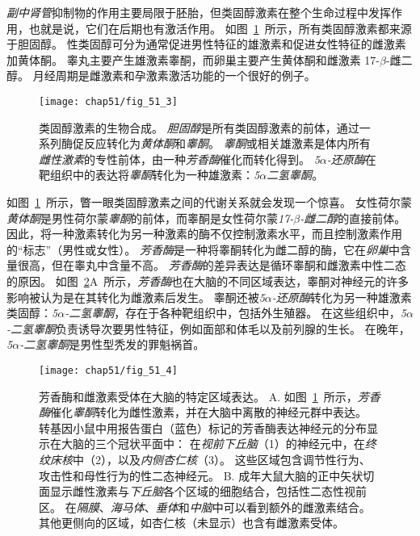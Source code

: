 \textit{副中肾管}抑制物的作用主要局限于胚胎，但类固醇激素在整个生命过程中发挥作用，也就是说，它们在后期也有激活作用。
如图~\ref{fig:51_3}~所示，所有类固醇激素都来源于胆固醇。
性类固醇可分为通常促进男性特征的雄激素和促进女性特征的雌激素加黄体酮。
睾丸主要产生雄激素睾酮，而卵巢主要产生黄体酮和雌激素 17-$ \beta $-雌二醇。
月经周期是雌激素和孕激素激活功能的一个很好的例子。


\begin{figure}[htbp]
	\centering
	\texttt{[image: chap51/fig\_51\_3]}
	\caption{类固醇激素的生物合成。
		\textit{胆固醇}是所有类固醇激素的前体，通过一系列酶促反应转化为\textit{黄体酮}和\textit{睾酮}。
		\textit{睾酮}或相关雄激素是体内所有\textit{雌性激素}的专性前体，由一种\textit{芳香酶}催化而转化得到。
		\textit{5$\alpha$-还原酶}在靶组织中的表达将\textit{睾酮}转化为一种雄激素：\textit{5$ \alpha $二氢睾酮}。}
	\label{fig:51_3}
\end{figure}


如图~\ref{fig:51_3}~所示，瞥一眼类固醇激素之间的代谢关系就会发现一个惊喜。
女性荷尔蒙\textit{黄体酮}是男性荷尔蒙\textit{睾酮}的前体，而睾酮是女性荷尔蒙\textit{17-$ \beta $-雌二醇}的直接前体。
因此，将一种激素转化为另一种激素的酶不仅控制激素水平，而且控制激素作用的“标志”（男性或女性）。
\textit{芳香酶}是一种将睾酮转化为雌二醇的酶，它在\textit{卵巢}中含量很高，但在睾丸中含量不高。
\textit{芳香酶}的差异表达是循环睾酮和雌激素中性二态的原因。
如图~\ref{fig:51_4}A~所示，\textit{芳香酶}也在大脑的不同区域表达，睾酮对神经元的许多影响被认为是在其转化为雌激素后发生。
睾酮还被\textit{5$\alpha$-还原酶}转化为另一种雄激素类固醇：\textit{5$\alpha$-二氢睾酮}，存在于各种靶组织中，包括外生殖器。
在这些组织中，\textit{5$\alpha$-二氢睾酮}负责诱导次要男性特征，例如面部和体毛以及前列腺的生长。
在晚年，\textit{5$\alpha$-二氢睾酮}是男性型秃发的罪魁祸首。


\begin{figure}[htbp]
	\centering
	\texttt{[image: chap51/fig\_51\_4]}
	\caption{芳香酶和雌激素受体在大脑的特定区域表达。 
		A. 如图~\ref{fig:51_3}~所示，\textit{芳香酶}催化\textit{睾酮}转化为雌性激素，并在大脑中离散的神经元群中表达。
		转基因小鼠中用报告蛋白（蓝色）标记的芳香酶表达神经元的分布显示在大脑的三个冠状平面中：
		在\textit{视前下丘脑}（1）的神经元中，在\textit{终纹床核}中（2），以及\textit{内侧杏仁核}（3）。
		这些区域包含调节性行为、攻击性和母性行为的性二态神经元\cite{wu2009estrogen}。
		B. 成年大鼠大脑的正中矢状切面显示雌性激素与\textit{下丘脑}各个区域的细胞结合，包括性二态性视前区。
		在\textit{隔膜}、\textit{海马体}、\textit{垂体}和\textit{中脑}中可以看到额外的雌激素结合。
		其他更侧向的区域，如杏仁核（未显示）也含有雌激素受体。}
	\label{fig:51_4}
\end{figure}



